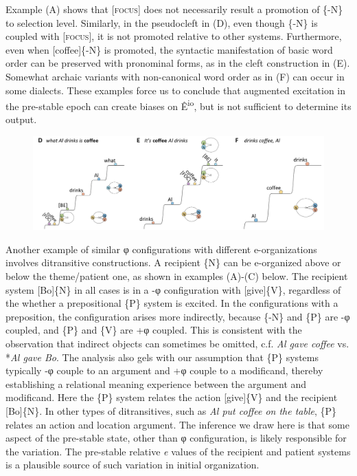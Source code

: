   Example (A) shows that [\textsc{focus}] does not necessarily result a promotion of \{-N\} to selection level. Similarly, in the pseudocleft in (D), even though \{-N\} is coupled with [\textsc{focus}], it is not promoted relative to other systems. Furthermore, even when [coffee]\{-N\} is promoted, the syntactic manifestation of basic word order can be preserved with pronominal forms, as in the cleft construction in (E). Somewhat archaic variants with non-canonical word order as in (F) can occur in some dialects. These examples force us to conclude that augmented excitation in the pre-stable epoch can create biases on Ê\textsuperscript{io}, but is not sufficient to determine its output. 

  
\begin{figure}
\includegraphics[width=\textwidth]{figures/Tilsen-img79.png}
\caption{\missingcaption}
\label{fig:}
\end{figure}
 

  Another example of similar φ configurations with different e-organizations involves ditransitive constructions. A recipient \{N\} can be e-organized above or below the theme/patient one, as shown in examples (A)-(C) below. The recipient system [Bo]\{N\} in all cases is in a -φ configuration with [give]\{V\}, regardless of the whether a prepositional \{P\} system is excited. In the configurations with a preposition, the configuration arises more indirectly, because \{-N\} and \{P\} are -φ coupled, and \{P\} and \{V\} are +φ coupled. This is consistent with the observation that indirect objects can sometimes be omitted, c.f. \textit{Al gave coffee} vs. *\textit{Al gave Bo}. The analysis also gels with our assumption that \{P\} systems typically -φ couple to an argument and +φ couple to a modificand, thereby establishing a relational meaning experience between the argument and modificand. Here the \{P\} system relates the action [give]\{V\} and the recipient [Bo]\{N\}. In other types of ditransitives, such as \textit{Al put coffee on the table}, \{P\} relates an action and location argument. The inference we draw here is that some aspect of the pre-stable state, other than φ configuration, is likely responsible for the variation. The pre-stable relative \textit{e} values of the recipient and patient systems is a plausible source of such variation in initial organization.

